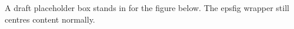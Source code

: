 \documentclass{article}
\begin{document}
A draft placeholder box stands in for the figure below.
The epsfig wrapper still centres content normally.
\end{document}
